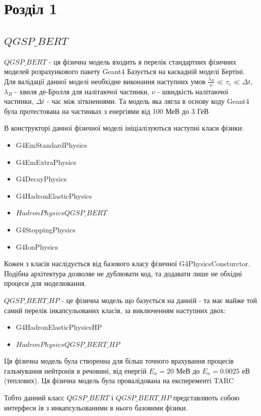 \documentclass[a4paper, 14pt]{article}
\numberwithin{equation}{section}
\numberwithin{table}{section}
\begin{document}
\setcounter{figure}{0} 
\newpage
\section{Розділ 1}
\setcounter{figure}{0} 
\subsection{$QGSP\_BERT$}
$QGSP\_BERT$ - ця фізична модель входить в перелік стандартних фізичних моделей розрахункового пакету Geant4
Базується на каскадній моделі Бертіні. Для валідації данної моделі необхідне виконання наступних умов $\frac{\lambda_B}{\nu} \ll \tau_c \ll \Delta{t}$, $\lambda_B$ - хвиля де-Бролля для налітаючої частинки, $\nu$ - швидкість налітаючої частинки, $\Delta{t}$ - час між зіткненнями. Та модель яка лягла в основу коду Geant4 була протестована на частинках з енергіями від 100 МеВ до 3 ГеВ

В конструкторі данної фізичної моделі ініціалізуються наступні класи фізики: 
\begin{itemize}
	\item G4EmStandardPhysics
	\item G4EmExtraPhysics
	\item G4DecayPhysics
	\item G4HadronElasticPhysics
	\item $HadronPhysicsQGSP\_BERT$
	\item G4StoppingPhysics
	\item G4IonPhysics
\end{itemize}
Кожен з класів наслідується від базового класу фізичної G4PhysicsConsturctor. Подібна архітектура дозволяе не дублювати код, та додавати лише не обхідні процеси для моделювання.

$QGSP\_BERT\_HP$ - це фізична модель що базується на данній - та має майже той самий перелік інкапсульованих класів, за виключенням наступних двох:
\begin{itemize}
	\item G4HadronElasticPhysicsHP
	\item $HadronPhysicsQGSP\_BERT\_HP$
\end{itemize}
Ця фізична модель була створенна для більш точного врахування процесів гальмування нейтронів в речовині, від енергій $E_n = 20$ МеВ до $E_n = 0.0025$ еВ (теплових). Ця фізична модель була провалідована на експеременті TARC
 
Тобто данний класс $QGSP\_BERT$ і $QGSP\_BERT\_HP$ представляють собою интерфеси ів з инкапсульованими в нього базовими фізики.
\end{document}
